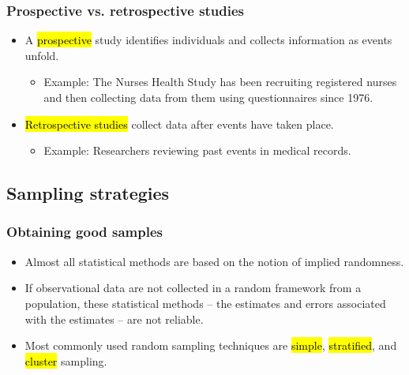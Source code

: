 
\begin{frame}
\frametitle{Prospective vs. retrospective studies}

\begin{itemize}

\item A \hl{prospective} study identifies individuals and collects information as events unfold. 
\begin{itemize}
\item Example: The Nurses Health Study has been recruiting registered nurses and then collecting data from them using questionnaires since 1976.
\end{itemize}

\item \hl{Retrospective studies} collect data after events have taken place.
\begin{itemize}
\item Example: Researchers reviewing past events in medical records.
\end{itemize}

\end{itemize}

\end{frame}


\subsection{Sampling strategies}


\begin{frame}
\frametitle{Obtaining good samples}

\begin{itemize}

\item Almost all statistical methods are based on the notion of implied randomness. 

\item If observational data are not collected in a random framework from a population, these statistical methods -- the estimates and errors associated with the estimates -- are not reliable.

\item Most commonly used random sampling techniques are \hl{simple}, \hl{stratified}, and \hl{cluster} sampling.

\end{itemize}

\end{frame}

